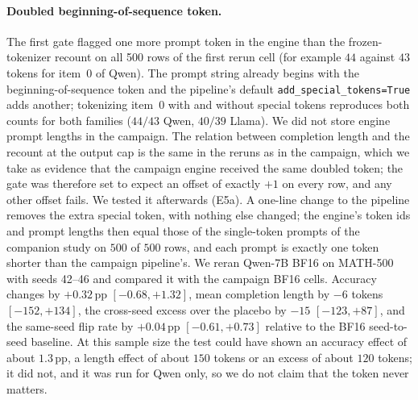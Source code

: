 \documentclass[11pt,a4paper]{article}
\begin{document}
\paragraph{Doubled beginning-of-sequence token.} The first gate flagged one more prompt token in the engine than the frozen-tokenizer recount on all 500 rows of the first rerun cell (for example $44$ against $43$ tokens for item~0 of Qwen). The prompt string already begins with the beginning-of-sequence token and the pipeline's default \texttt{add\_special\_tokens=True} adds another; tokenizing item~0 with and without special tokens reproduces both counts for both families ($44/43$ Qwen, $40/39$ Llama). We did not store engine prompt lengths in the campaign. The relation between completion length and the recount at the output cap is the same in the reruns as in the campaign, which we take as evidence that the campaign engine received the same doubled token; the gate was therefore set to expect an offset of exactly $+1$ on every row, and any other offset fails. We tested it afterwards (E5a). A one-line change to the pipeline removes the extra special token, with nothing else changed; the engine's token ids and prompt lengths then equal those of the single-token prompts of the companion study on $500$ of $500$ rows, and each prompt is exactly one token shorter than the campaign pipeline's. We reran Qwen-7B BF16 on MATH-500 with seeds 42--46 and compared it with the campaign BF16 cells. Accuracy changes by $+0.32$\,pp $[-0.68,+1.32]$, mean completion length by $-6$ tokens $[-152,+134]$, the cross-seed excess over the placebo by $-15$ $[-123,+87]$, and the same-seed flip rate by $+0.04$\,pp $[-0.61,+0.73]$ relative to the BF16 seed-to-seed baseline. At this sample size the test could have shown an accuracy effect of about $1.3$\,pp, a length effect of about $150$ tokens or an excess of about $120$ tokens; it did not, and it was run for Qwen only, so we do not claim that the token never matters.
\end{document}
